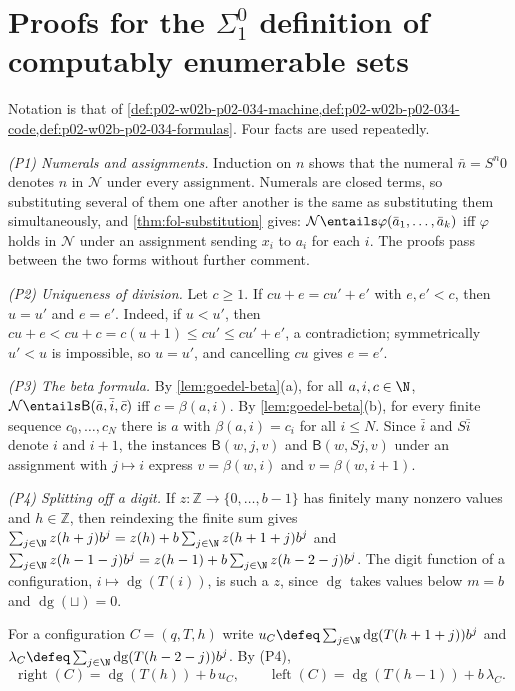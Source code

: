 \section{Proofs for the \(\Sigma^0_1\) definition of computably enumerable sets}
\label{sec:annex-p02-w02b-p02-034}

Notation is that of
\cref{def:p02-w02b-p02-034-machine,def:p02-w02b-p02-034-code,def:p02-w02b-p02-034-formulas}.
Four facts are used repeatedly.

\emph{(P1) Numerals and assignments.}  Induction on \(n\) shows that the
numeral \(\bar n=S^n0\) denotes \(n\) in \(\mathcal N\) under every
assignment.  Numerals are closed terms, so substituting several of them one
after another is the same as substituting them simultaneously, and
\cref{thm:fol-substitution} gives: \(\mathcal N\entails\varphi(\bar a_1,\ldots,\bar a_k)\)
iff \(\varphi\) holds in \(\mathcal N\) under an assignment sending
\(x_i\) to \(a_i\) for each \(i\).  The proofs pass between the two forms
without further comment.

\emph{(P2) Uniqueness of division.}  Let \(c\geq1\).  If \(cu+e=cu'+e'\) with
\(e,e'<c\), then \(u=u'\) and \(e=e'\).  Indeed, if \(u<u'\), then
\(cu+e<cu+c=c(u+1)\leq cu'\leq cu'+e'\), a contradiction; symmetrically
\(u'<u\) is impossible, so \(u=u'\), and cancelling \(cu\) gives \(e=e'\).

\emph{(P3) The beta formula.}  By \cref{lem:goedel-beta}(a), for all
\(a,i,c\in\N\), \(\mathcal N\entails\mathsf B(\bar a,\bar i,\bar c)\) iff
\(c=\beta(a,i)\).  By \cref{lem:goedel-beta}(b), for every finite sequence
\(c_0,\ldots,c_N\) there is \(a\) with \(\beta(a,i)=c_i\) for all
\(i\leq N\).  Since \(\bar i\) and \(S\bar i\) denote \(i\) and \(i+1\), the
instances \(\mathsf B(w,j,v)\) and \(\mathsf B(w,Sj,v)\) under an assignment
with \(j\mapsto i\) express \(v=\beta(w,i)\) and \(v=\beta(w,i+1)\).

\emph{(P4) Splitting off a digit.}  If \(z:\mathbb Z\to\{0,\ldots,b-1\}\) has
finitely many nonzero values and \(h\in\mathbb Z\), then reindexing the finite sum
gives
\(\sum_{j\in\N}z(h+j)b^j=z(h)+b\sum_{j\in\N}z(h+1+j)b^j\) and
\(\sum_{j\in\N}z(h-1-j)b^j=z(h-1)+b\sum_{j\in\N}z(h-2-j)b^j\).
The digit function of a configuration, \(i\mapsto\operatorname{dg}(T(i))\),
is such a \(z\), since \(\operatorname{dg}\) takes values below \(m=b\) and
\(\operatorname{dg}(\sqcup)=0\).

For a configuration \(C=(q,T,h)\) write
\(u_C\defeq\sum_{j\in\N}\operatorname{dg}(T(h+1+j))b^j\) and
\(\lambda_C\defeq\sum_{j\in\N}\operatorname{dg}(T(h-2-j))b^j\).  By (P4),
\[
 \operatorname{right}(C)=\operatorname{dg}(T(h))+b\,u_C,
 \qquad
 \operatorname{left}(C)=\operatorname{dg}(T(h-1))+b\,\lambda_C.
 \tag{E}
\]

